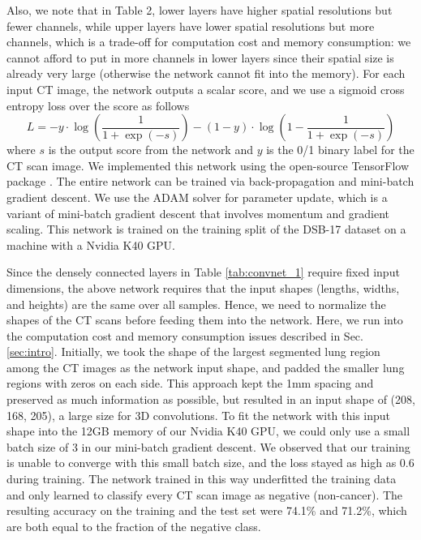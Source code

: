 \documentclass{article}
\begin{document}
Also, we note that in Table 2, lower layers have higher spatial resolutions but fewer channels, while upper layers have lower spatial resolutions but more channels, which is a trade-off for computation cost and memory consumption: we cannot afford to put in more channels in lower layers since their spatial size is already very large (otherwise the network cannot fit into the memory). For each input CT image, the network outputs a scalar score, and we use a sigmoid cross entropy loss over the score as follows
\begin{equation}
\label{eqn:loss}
L = - y \cdot \log \left( \frac{1}{1 + \exp(-s)} \right) - (1 - y) \cdot \log \left(1 - \frac{1}{1 + \exp(-s)}\right)
\end{equation}
where $s$ is the output score from the network and $y$ is the 0/1 binary label for the CT scan image. We implemented this network using the open-source TensorFlow package \cite{abadi2016tensorflow}. The entire network can be trained via back-propagation and mini-batch gradient descent. %
We use the ADAM solver \cite{kingma2014adam} for parameter update, which is a variant of mini-batch gradient descent that involves momentum and gradient scaling. This network is trained on the training split of the DSB-17 dataset on a machine with a Nvidia K40 GPU.

Since the densely connected layers in Table \ref{tab:convnet_1} require fixed input dimensions, the above network requires that the input shapes (lengths, widths, and heights) are the same over all samples. Hence, we need to normalize the shapes of the CT scans before feeding them into the network. Here, we run into the computation cost and memory consumption issues described in Sec. \ref{sec:intro}. Initially, we took the shape of the largest segmented lung region among the CT images as the network input shape, and padded the smaller lung regions with zeros on each side. This approach kept the 1mm spacing and preserved as much information as possible, but resulted in an input shape of (208, 168, 205), a large size for 3D convolutions. To fit the network with this input shape into the 12GB memory of our Nvidia K40 GPU, we could only use a  small batch size of 3 in our mini-batch gradient descent. We observed that our training is unable to converge with this small batch size, and the loss stayed as high as 0.6 during training. The network trained in this way underfitted the training data and only learned to classify every CT scan image as negative (non-cancer). The resulting accuracy on the training and the test set were 74.1\% and 71.2\%, which are both equal to the fraction of the negative class.
\end{document}
